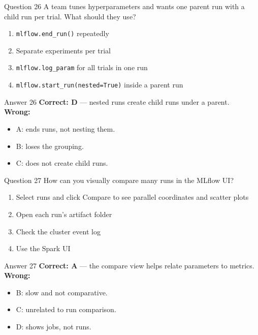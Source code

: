\documentclass[aspectratio=169,11pt]{beamer}
\begin{document}
	\begin{frame}{Question 26}
		A team tunes hyperparameters and wants one parent run with a child run per trial. What should they use?
		\begin{enumerate}[label=\Alph*.]
			\item \texttt{mlflow.end\_run()} repeatedly
			\item Separate experiments per trial
			\item \texttt{mlflow.log\_param} for all trials in one run
			\item \texttt{mlflow.start\_run(nested=True)} inside a parent run
		\end{enumerate}
	\end{frame}
	\begin{frame}{Answer 26}
		\textbf{Correct: D} --- nested runs create child runs under a parent.\\
		\vspace{0.5em}
		\textbf{Wrong:}
		\begin{itemize}
			\item A: ends runs, not nesting them.
			\item B: loses the grouping.
			\item C: does not create child runs.
		\end{itemize}
	\end{frame}
	
	\begin{frame}{Question 27}
		How can you visually compare many runs in the MLflow UI?
		\begin{enumerate}[label=\Alph*.]
			\item Select runs and click Compare to see parallel coordinates and scatter plots
			\item Open each run's artifact folder
			\item Check the cluster event log
			\item Use the Spark UI
		\end{enumerate}
	\end{frame}
	\begin{frame}{Answer 27}
		\textbf{Correct: A} --- the compare view helps relate parameters to metrics.\\
		\vspace{0.5em}
		\textbf{Wrong:}
		\begin{itemize}
			\item B: slow and not comparative.
			\item C: unrelated to run comparison.
			\item D: shows jobs, not runs.
		\end{itemize}
	\end{frame}
	
\end{document}

